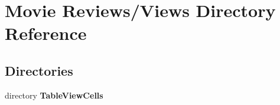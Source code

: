 \section{Movie Reviews/\+Views Directory Reference}
\label{dir_d2bc7632973aa8095bf4fa3079d8a508}
\subsection*{Directories}
\begin{DoxyCompactItemize}
\item 
directory {\bf Table\+View\+Cells}
\end{DoxyCompactItemize}
